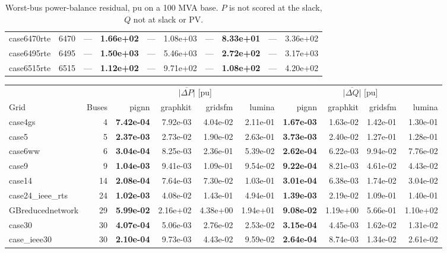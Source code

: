 \documentclass[10pt]{article}
\begin{document}
\begin{table}[H]
\begin{tabular}{lr rrrr rrrr}
case6470rte & 6470 & --- & \textbf{1.66e+02} & --- & 1.08e+03 & --- & \textbf{8.33e+01} & --- & 3.36e+02 \\
case6495rte & 6495 & --- & \textbf{1.50e+03} & --- & 5.46e+03 & --- & \textbf{2.72e+02} & --- & 3.17e+03 \\
case6515rte & 6515 & --- & \textbf{1.12e+02} & --- & 9.71e+02 & --- & \textbf{1.08e+02} & --- & 4.20e+02 \\
\bottomrule
\end{tabular}
\caption{Worst-bus power-balance residual, pu on a 100 MVA base. $P$ is not scored at the slack, $Q$ not at slack or PV.}
\end{table}

\begin{table}[H]
\centering\small
\begin{tabular}{lr rrrr rrrr}
\toprule
 & & \multicolumn{4}{c}{$\overline{|\Delta P|}$ [pu]} & \multicolumn{4}{c}{$\overline{|\Delta Q|}$ [pu]} \\
\cmidrule(lr){3-6}\cmidrule(lr){7-10}
Grid & Buses & pignn & graphkit & gridsfm & lumina & pignn & graphkit & gridsfm & lumina \\
\midrule
case4gs & 4 & \textbf{7.42e-04} & 7.92e-03 & 4.04e-02 & 2.11e-01 & \textbf{1.67e-03} & 1.63e-02 & 1.42e-01 & 1.30e-01 \\
case5 & 5 & \textbf{2.37e-03} & 2.73e-02 & 1.90e-02 & 2.63e-01 & \textbf{3.73e-03} & 2.40e-02 & 1.27e-01 & 1.28e-01 \\
case6ww & 6 & \textbf{3.04e-04} & 8.25e-03 & 2.36e-01 & 5.39e-02 & \textbf{2.62e-04} & 6.22e-03 & 9.94e-02 & 7.76e-02 \\
case9 & 9 & \textbf{1.04e-03} & 9.41e-03 & 1.09e-01 & 9.54e-02 & \textbf{9.22e-04} & 8.21e-03 & 4.61e-02 & 4.43e-02 \\
case14 & 14 & \textbf{2.08e-04} & 7.64e-03 & 7.30e-02 & 1.03e-01 & \textbf{3.01e-04} & 6.38e-03 & 1.74e-02 & 3.04e-02 \\
case24\_ieee\_rts & 24 & \textbf{1.02e-03} & 4.08e-02 & 1.43e-01 & 4.94e-01 & \textbf{1.39e-03} & 2.19e-02 & 1.09e-01 & 1.40e-01 \\
GBreducednetwork & 29 & \textbf{5.99e-02} & 2.16e+02 & 4.38e+00 & 1.94e+01 & \textbf{9.08e-02} & 1.19e+00 & 5.66e-01 & 1.10e+02 \\
case30 & 30 & \textbf{4.07e-04} & 5.06e-03 & 2.76e-02 & 2.53e-02 & \textbf{3.15e-04} & 4.45e-03 & 1.62e-02 & 1.31e-02 \\
case\_ieee30 & 30 & \textbf{2.10e-04} & 9.73e-03 & 4.43e-02 & 9.59e-02 & \textbf{2.64e-04} & 8.74e-03 & 1.34e-02 & 2.61e-02 \\

\end{tabular}
\end{table}
\end{document}
